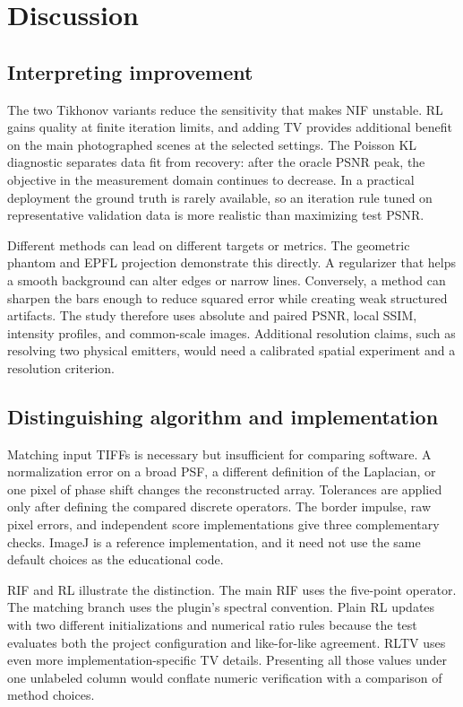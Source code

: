 \FloatBarrier
\section{Discussion}
\label{sec:discussion}

\subsection{Interpreting improvement}

The two Tikhonov variants reduce the sensitivity that makes NIF unstable. RL gains quality at finite iteration limits, and adding TV provides additional benefit on the main photographed scenes at the selected settings. The Poisson KL diagnostic separates data fit from recovery: after the oracle PSNR peak, the objective in the measurement domain continues to decrease. In a practical deployment the ground truth is rarely available, so an iteration rule tuned on representative validation data is more realistic than maximizing test PSNR.

Different methods can lead on different targets or metrics. The geometric phantom and EPFL projection demonstrate this directly. A regularizer that helps a smooth background can alter edges or narrow lines. Conversely, a method can sharpen the bars enough to reduce squared error while creating weak structured artifacts. The study therefore uses absolute and paired PSNR, local SSIM, intensity profiles, and common-scale images. Additional resolution claims, such as resolving two physical emitters, would need a calibrated spatial experiment and a resolution criterion.

\subsection{Distinguishing algorithm and implementation}

Matching input TIFFs is necessary but insufficient for comparing software. A normalization error on a broad PSF, a different definition of the Laplacian, or one pixel of phase shift changes the reconstructed array. Tolerances are applied only after defining the compared discrete operators. The border impulse, raw pixel errors, and independent score implementations give three complementary checks. ImageJ is a reference implementation, and it need not use the same default choices as the educational code.

RIF and RL illustrate the distinction. The main RIF uses the five-point operator. The matching branch uses the plugin's spectral convention. Plain RL updates with two different initializations and numerical ratio rules because the test evaluates both the project configuration and like-for-like agreement. RLTV uses even more implementation-specific TV details. Presenting all those values under one unlabeled column would conflate numeric verification with a comparison of method choices.

